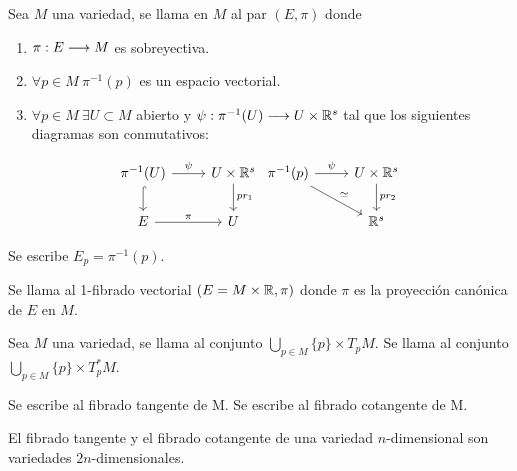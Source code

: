 \begin{definition}
  Sea $M$ una variedad, se llama  en $M$ al par $(E, \pi)$ donde
  \begin{enumerate}
    \item $\pi:E\longrightarrow M$ es sobreyectiva.
    \item $\forall p\in M\ \pi^{-1}(p)$ es un espacio vectorial.
    \item $\forall p\in M\ \exists U\subset M$ abierto y $\psi:\pi^{-1}(U)\longrightarrow U\times\mathbb{R}^s$ tal que los siguientes diagramas son conmutativos:
  \end{enumerate}
  \[
    \begin{tikzcd}
      \pi^{-1}(U)\arrow{r}{\psi}\arrow[hook]{d} & U\times\R^s\arrow{d}{pr_1}\\
      E\arrow{r}{\pi} & U
    \end{tikzcd}
    \begin{tikzcd}
      \pi^{-1}(p)\arrow{r}{\psi}\arrow{dr}{\simeq} & U\times\R^s\arrow{d}{pr_2}\\
       & \R^s
    \end{tikzcd}
  \]
\end{definition}
\begin{notation}
  Se escribe $E_p=\pi^{-1}(p)$.
\end{notation}

\begin{definition}
Se llama  al 1-fibrado vectorial $(E=M\times\mathbb{R},\pi)$ donde
$\pi$
es la proyección canónica de $E$ en $M$.
\end{definition}

\begin{definition}
  Sea $M$ una variedad, se llama  al conjunto $\bigcup_{p\in M}\{p\}\times T_pM$.
  Se llama  al conjunto $\bigcup_{p\in M}\{p\}\times T^*_pM$.
\end{definition}
\begin{notation}
  Se escribe  al fibrado tangente de M.
  Se
  escribe
   al fibrado cotangente
  de
  M.
\end{notation}

\begin{exercise}
  El fibrado tangente y el fibrado cotangente de una variedad $n$-dimensional son variedades $2n$-dimensionales.
\end{exercise}

